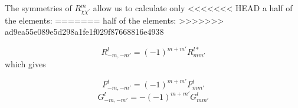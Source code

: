 The symmetries of $R_{\chi\chi'}^{m}$ allow us to calculate only
<<<<<<< HEAD
a half of the elements: 
=======
half of the elements: 
>>>>>>> ad9ea55e089e5d298a1fe1f029f87668816e4938

\begin{equation}
R_{-m,-m'}^{l}=\left(-1\right)^{m+m'}R_{mm'}^{l*}
\end{equation}
which gives

\begin{equation}
F_{-m,-m'}^{l}=\left(-1\right)^{m+m'}F_{mm'}^{l}
\end{equation}
\begin{equation}
G_{-m,-m'}^{l}=-\left(-1\right)^{m+m'}G_{mm'}^{l}
\end{equation}

